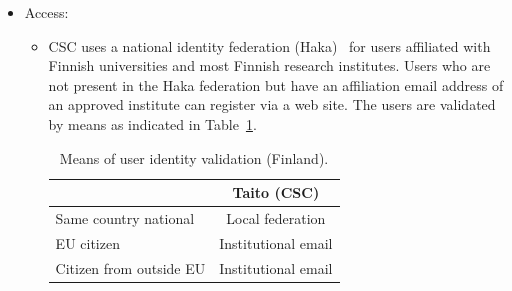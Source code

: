 \documentclass{article}
\begin{document}
\begin{itemize}
\item[]Access:
\begin{itemize} 
\item[] CSC uses a national identity federation (Haka)~\cite{haka} for users affiliated with Finnish universities and most Finnish research institutes. Users who are not present in the Haka federation but have an affiliation email address of an approved institute can register via a web site. The users are validated by means as indicated in Table~\ref{tab:FI_user_acc_val}.

\begin{table}[!h]
    \centering
    \begin{tabular}{|l|c|}
        \hline
    & Taito (CSC)  \\
    \hline
  Same country national      &  Local federation \\
    \hline
    EU citizen       &  Institutional email\\
        \hline
        Citizen from outside EU	         &  Institutional email \\
        \hline
       
        \end{tabular}
    \caption{Means of user identity validation (Finland).}
    \label{tab:FI_user_acc_val}
\end{table}
\end{itemize} 
\end{itemize}
\end{document}
